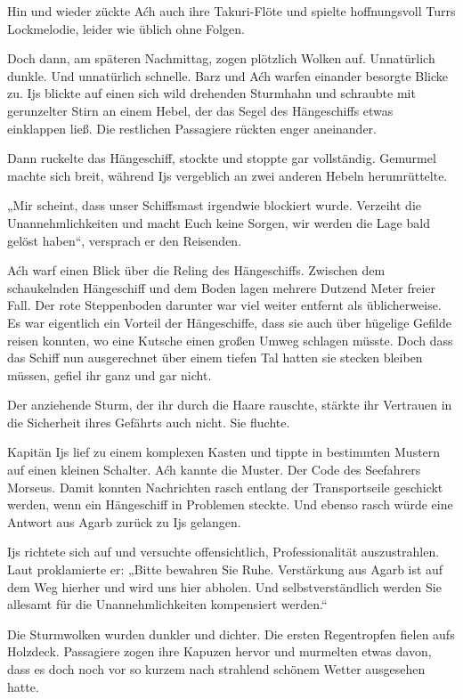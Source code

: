 Hin und wieder zückte Aćh auch ihre Takuri-Flöte und spielte hoffnungsvoll Turrs Lockmelodie, leider wie üblich ohne Folgen.

Doch dann, am späteren Nachmittag, zogen plötzlich Wolken auf. Unnatürlich dunkle. Und unnatürlich schnelle. Barz und Aćh warfen einander besorgte Blicke zu. Ijs blickte auf einen sich wild drehenden Sturmhahn und schraubte mit gerunzelter Stirn an einem Hebel, der das Segel des Hängeschiffs etwas einklappen ließ. Die restlichen Passagiere rückten enger aneinander.

Dann ruckelte das Hängeschiff, stockte und stoppte gar vollständig. Gemurmel machte sich breit, während Ijs vergeblich an zwei anderen Hebeln herumrüttelte.

„Mir scheint, dass unser Schiffsmast irgendwie blockiert wurde. Verzeiht die Unannehmlichkeiten und macht Euch keine Sorgen, wir werden die Lage bald gelöst haben“, versprach er den Reisenden.

Aćh warf einen Blick über die Reling des Hängeschiffs. Zwischen dem schaukelnden Hängeschiff und dem Boden lagen mehrere Dutzend Meter freier Fall. Der rote Steppenboden darunter war viel weiter entfernt als üblicherweise. Es war eigentlich ein Vorteil der Hängeschiffe, dass sie auch über hügelige Gefilde reisen konnten, wo eine Kutsche einen großen Umweg schlagen müsste. Doch dass das Schiff nun ausgerechnet über einem tiefen Tal hatten sie stecken bleiben müssen, gefiel ihr ganz und gar nicht.

Der anziehende Sturm, der ihr durch die Haare rauschte, stärkte ihr Vertrauen in die Sicherheit ihres Gefährts auch nicht. Sie fluchte.

Kapitän Ijs lief zu einem komplexen Kasten und tippte in bestimmten Mustern auf einen kleinen Schalter. Aćh kannte die Muster. Der Code des Seefahrers Morseus. Damit konnten Nachrichten rasch entlang der Transportseile geschickt werden, wenn ein Hängeschiff in Problemen steckte. Und ebenso rasch würde eine Antwort aus Agarb zurück zu Ijs gelangen.

Ijs richtete sich auf und versuchte offensichtlich, Professionalität auszustrahlen. Laut proklamierte er: „Bitte bewahren Sie Ruhe. Verstärkung aus Agarb ist auf dem Weg hierher und wird uns hier abholen. Und selbstverständlich werden Sie allesamt für die Unannehmlichkeiten kompensiert werden.“

Die Sturmwolken wurden dunkler und dichter. Die ersten Regentropfen fielen aufs Holzdeck. Passagiere zogen ihre Kapuzen hervor und murmelten etwas davon, dass es doch noch vor so kurzem nach strahlend schönem Wetter ausgesehen hatte.

